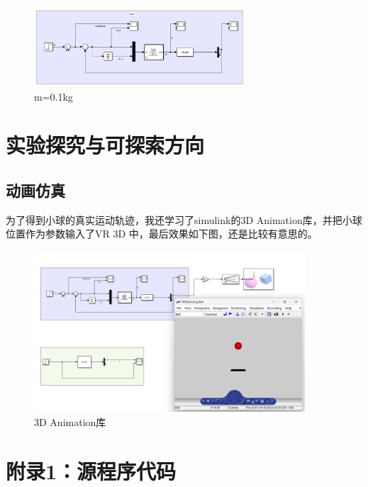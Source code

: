 \documentclass[12pt,a4paper,UTF8]{article}
\begin{document}
\begin{figure}[htbp] \centering \includegraphics[width=0.7\textwidth]{figures/2024-12-13-23-51-42.png} \caption{m=0.1kg} \label{fig:m01} \end{figure}

\clearpage
\section{实验探究与可探索方向}

\subsection{动画仿真}

为了得到小球的真实运动轨迹，我还学习了simulink的3D Animation库，并把小球位置作为参数输入了VR 3D 中，最后效果如下图，还是比较有意思的。

\begin{figure}[htbp] \centering \includegraphics[width=0.9\textwidth]{figures/2024-12-13-22-27-25.png} \caption{3D Animation库}\end{figure}


\clearpage
\appendix
\section{附录1：源程序代码}

\end{document}
